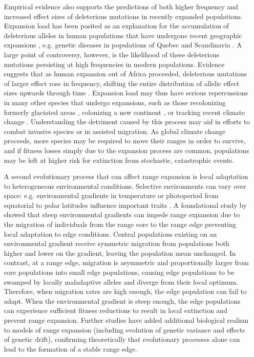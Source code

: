 Empirical evidence also supports the predictions of both higher frequency and increased effect sizes of deleterious mutations in recently expanded populations. Expansion load has been posited as an explanation for the accumulation of deleterious alleles in human populations that have undergone recent geographic expansions \citep{Karlsson:2014}, e.g. genetic diseases in populations of Quebec \citep{Scriver:2001, Yotova:2005, Labuda:1997} and Scandinavia \citep{Norio:2003}. A large point of controversy, however, is the likelihood of these deleterious mutations persisting at high frequencies in modern populations. Evidence suggests that as human expansion out of Africa proceeded, deleterious mutations of larger effect rose in frequency, shifting the entire distribution of allelic effect sizes upwards through time \citep{Henn:2015}. Expansion load may thus have serious repercussions in many other species that undergo expansions, such as those recolonizing formerly glaciated areas \citep{Hewitt:1999}, colonizing a new continent \citep{Sakai:2001}, or tracking recent climate change \citep{Chen:2011}. Understanding the detriment caused by this process may aid in efforts to combat invasive species or in assisted migration. As global climate change proceeds, more species may be required to move their ranges in order to survive, and if fitness losses simply due to the expansion process are common, populations may be left at higher risk for extinction from stochastic, catastrophic events. 

A second evolutionary process that can affect range expansion is local adaptation to heterogeneous environmental conditions. Selective environments can vary over space: e.g. environmental gradients in temperature or photoperiod from equatorial to polar latitudes influence important traits \citep{Conover:1992, Montague:2008}. A foundational study by \citet{Kirkpatrick:1997} showed that steep environmental gradients can impede range expansion due to the migration of individuals from the range core to the range edge preventing local adaptation to edge conditions. Central populations existing on an environmental gradient receive symmetric migration from populations both higher and lower on the gradient, leaving the population mean unchanged. In contrast, at a range edge, migration is asymmetric and proportionally larger from core populations into small edge populations, causing edge populations to be swamped by locally maladaptive alleles and diverge from their local optimum. Therefore, when migration rates are high enough, the edge population can fail to adapt. When the environmental gradient is steep enough, the edge populations can experience sufficient fitness reductions to result in local extinction and prevent range expansion. Further studies \citep{Barton:2001, Polechova:2015} have added additional biological realism to models of range expansion (including evolution of genetic variance and effects of genetic drift), confirming theoretically that evolutionary processes alone can lead to the formation of a stable range edge. 


